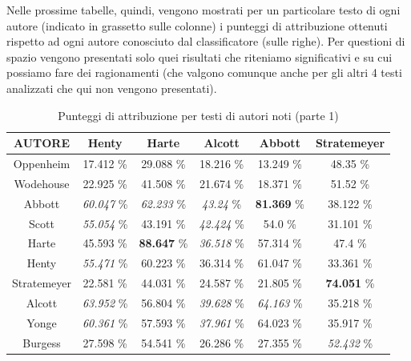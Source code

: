 \documentclass[titlepage]{article}
\begin{document}
Nelle prossime tabelle, quindi, vengono mostrati per un particolare testo di ogni autore (indicato in grassetto sulle colonne) i punteggi di attribuzione ottenuti rispetto ad ogni autore conosciuto dal classificatore (sulle righe). Per questioni di spazio vengono presentati solo quei risultati che riteniamo significativi e su cui possiamo fare dei ragionamenti (che valgono comunque anche per gli altri 4 testi analizzati che qui non vengono presentati).
\begin{table}[htp]
\centering
\footnotesize
\begin{tabular}{cccccc}
    \toprule
    \textbf{AUTORE} & \textbf{Henty} & \textbf{Harte} & \textbf{Alcott} & \textbf{Abbott} & \textbf{Stratemeyer} \\
    
    \midrule
    Oppenheim & 17.412 \% & 29.088 \% & 18.216 \% & 13.249 \% & 48.35 \% \\
    
    \midrule
    Wodehouse & 22.925 \% & 41.508 \% & 21.674 \% & 18.371 \% & 51.52 \% \\
    
    \midrule
    Abbott & \textit{60.047} \% & \textit{62.233} \% & \textit{43.24} \% & \textbf{81.369} \% & 38.122 \% \\
    
    \midrule
    Scott & \textit{55.054} \% & 43.191 \% & \textit{42.424} \% & 54.0 \% & 31.101 \% \\
    
    \midrule
    Harte & 45.593 \% & \textbf{88.647} \% & \textit{36.518} \% & 57.314 \% & 47.4 \% \\
    
    \midrule
    Henty & \textit{55.471} \% & 60.223 \% & 36.314 \% & 61.047 \% & 33.361 \% \\
    
    \midrule
    Stratemeyer & 22.581 \% & 44.031 \% & 24.587 \% & 21.805 \% & \textbf{74.051} \% \\
    
    \midrule
    Alcott & \textit{63.952} \% & 56.804 \% & \textit{39.628} \% & \textit{64.163} \% & 35.218 \% \\
    
    \midrule
    Yonge & \textit{60.361} \% & 57.593 \% & \textit{37.961} \% & 64.023 \% & 35.917 \% \\
    
    \midrule
    Burgess & 27.598 \% & 54.541 \% & 26.286 \% & 27.355 \% & \textit{52.432} \% \\
    
    \bottomrule
\end{tabular}
\caption{Punteggi di attribuzione per testi di autori noti (parte 1)}
\end{table}
\end{document}
